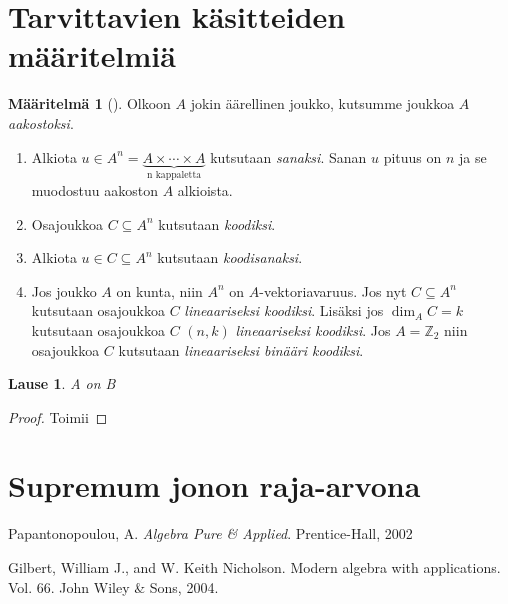 \documentclass[a4paper,12pt,leqno,oneside]{report} %
\theoremstyle{plain}
\newtheorem{lause}{Lause}[chapter]
\theoremstyle{definition}
\newtheorem{maaritelma}{Määritelmä}[chapter]
\theoremstyle{remark}
\numberwithin{equation}{chapter}
\newcommand*{\Zset}{\mathbb{Z}}  %
\begin{document}
    \section{Tarvittavien käsitteiden määritelmiä}
    \begin{maaritelma}[{\cite[s.~491]{PA}}]
        Olkoon $A$ jokin äärellinen joukko, kutsumme joukkoa $A$ \emph{aakostoksi}.

        \begin{enumerate}
            \item Alkiota $u \in  A^n = \underbrace{A \times \cdots \times A}_{\text{n kappaletta}}$ kutsutaan \emph{sanaksi}. Sanan $u$ pituus on $n$ ja se muodostuu aakoston $A$ alkioista.
            \item Osajoukkoa $C \subseteq A^n$ kutsutaan \emph{koodiksi}.
            \item Alkiota $u \in C \subseteq A^n$ kutsutaan \emph{koodisanaksi}.
            \item Jos joukko $A$ on kunta, niin $A^n$ on $A$-vektoriavaruus. Jos nyt $C \subseteq A^n$ kutsutaan osajoukkoa $C$ \emph{lineaariseksi koodiksi}. Lisäksi jos $\dim_A C = k$ kutsutaan osajoukkoa $C$ $(n, k)$ \emph{lineaariseksi koodiksi}. Jos $A = \Zset_2$ niin osajoukkoa $C$ kutsutaan \emph{lineaariseksi binääri koodiksi}.
        \end{enumerate}
    \end{maaritelma}


    \begin{lause}\label{thm: kasautumispisteen ympäristössä}
        A on B
\end{lause}

\begin{proof}
    Toimii
\end{proof}

\section{Supremum jonon raja-arvona}%
\label{sec: Supremum jonon raja-arvona}



\begin{thebibliography}{9}


    Papantonopoulou, A. \emph{Algebra Pure \& Applied}.
    Prentice-Hall, 2002

    Gilbert, William J., and W. Keith Nicholson. Modern algebra with applications. Vol. 66. John Wiley & Sons, 2004.

\end{thebibliography}
\end{document}
